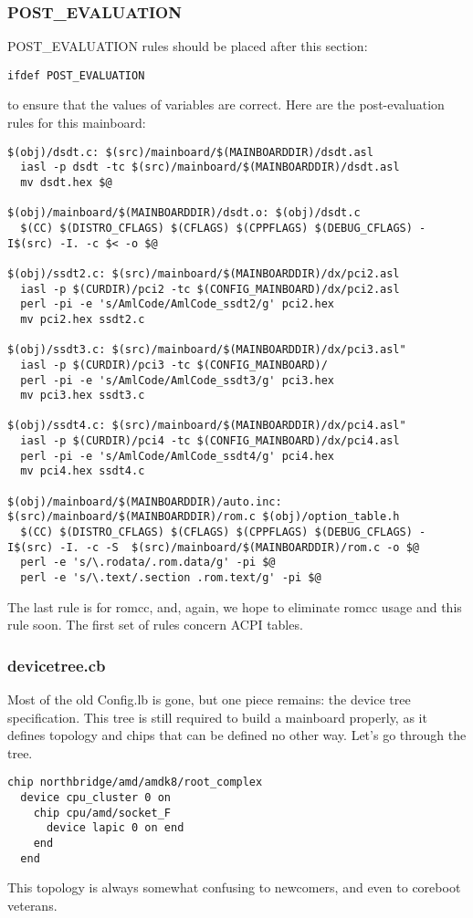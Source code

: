 \documentclass[10pt,letterpaper]{article}
\begin{document}
\subsubsection{POST\_EVALUATION}
POST\_EVALUATION rules should be placed after this section:
\begin{verbatim}
ifdef POST_EVALUATION
\end{verbatim}
to ensure that the values of variables are correct.
Here are the post-evaluation rules for this mainboard:
\begin{verbatim}
$(obj)/dsdt.c: $(src)/mainboard/$(MAINBOARDDIR)/dsdt.asl
  iasl -p dsdt -tc $(src)/mainboard/$(MAINBOARDDIR)/dsdt.asl
  mv dsdt.hex $@

$(obj)/mainboard/$(MAINBOARDDIR)/dsdt.o: $(obj)/dsdt.c
  $(CC) $(DISTRO_CFLAGS) $(CFLAGS) $(CPPFLAGS) $(DEBUG_CFLAGS) -I$(src) -I. -c $< -o $@

$(obj)/ssdt2.c: $(src)/mainboard/$(MAINBOARDDIR)/dx/pci2.asl
  iasl -p $(CURDIR)/pci2 -tc $(CONFIG_MAINBOARD)/dx/pci2.asl
  perl -pi -e 's/AmlCode/AmlCode_ssdt2/g' pci2.hex
  mv pci2.hex ssdt2.c

$(obj)/ssdt3.c: $(src)/mainboard/$(MAINBOARDDIR)/dx/pci3.asl"
  iasl -p $(CURDIR)/pci3 -tc $(CONFIG_MAINBOARD)/
  perl -pi -e 's/AmlCode/AmlCode_ssdt3/g' pci3.hex
  mv pci3.hex ssdt3.c

$(obj)/ssdt4.c: $(src)/mainboard/$(MAINBOARDDIR)/dx/pci4.asl"
  iasl -p $(CURDIR)/pci4 -tc $(CONFIG_MAINBOARD)/dx/pci4.asl
  perl -pi -e 's/AmlCode/AmlCode_ssdt4/g' pci4.hex
  mv pci4.hex ssdt4.c

$(obj)/mainboard/$(MAINBOARDDIR)/auto.inc: $(src)/mainboard/$(MAINBOARDDIR)/rom.c $(obj)/option_table.h
  $(CC) $(DISTRO_CFLAGS) $(CFLAGS) $(CPPFLAGS) $(DEBUG_CFLAGS) -I$(src) -I. -c -S  $(src)/mainboard/$(MAINBOARDDIR)/rom.c -o $@
  perl -e 's/\.rodata/.rom.data/g' -pi $@
  perl -e 's/\.text/.section .rom.text/g' -pi $@

\end{verbatim}
The last rule is for romcc, and, again, we hope to eliminate romcc usage and this rule soon. The first set of rules concern ACPI tables.
\subsubsection{devicetree.cb}
Most of the old Config.lb is gone, but one piece remains: the device tree specification. This tree is still required to build a mainboard
properly, as it defines topology and chips that can be defined no other way.
Let's go through the tree.
\begin{verbatim}
chip northbridge/amd/amdk8/root_complex
  device cpu_cluster 0 on
    chip cpu/amd/socket_F
      device lapic 0 on end
    end
  end
\end{verbatim}
This topology is always somewhat confusing to newcomers, and even to coreboot veterans.
\end{document}
